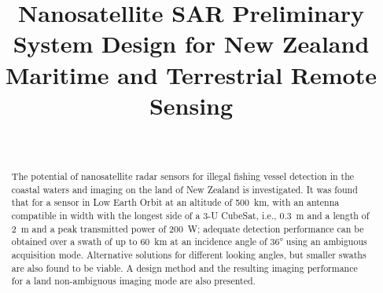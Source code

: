 \documentclass[conference,a4paper]{IEEEtran}
\begin{document}
%
    \title{Nanosatellite SAR Preliminary System Design for New Zealand Maritime and Terrestrial Remote Sensing}

    \author{                                     %
    \\
    }





    \maketitle

    \begin{abstract}
        The potential of nanosatellite radar sensors for illegal fishing vessel detection in the coastal waters and imaging on the land of New Zealand is investigated.
        It was found that for a sensor in Low Earth Orbit at an altitude of 500~km, with an antenna compatible in width with the longest side of a 3-U CubeSat, i.e., 0.3~m and a length of 2~m and a peak transmitted power of 200~W; adequate detection performance can be obtained over a swath of up to 60~km at an incidence angle of 36° using an ambiguous acquisition mode.
        Alternative solutions for different looking angles, but smaller swaths are also found to be viable.
        A design method and the resulting imaging performance for a land non-ambiguous imaging mode are also presented.
    \end{abstract}
\end{document}
